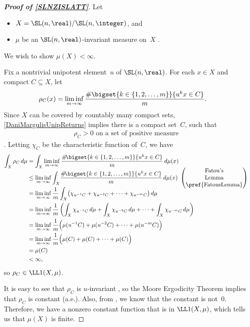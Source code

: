 \begin{proof}[\bf Proof of \cref{SLNZISLATT}]
Let 
	\begin{itemize}
	\item $X = \SL(n,\real)/\SL(n,\integer)$,
	and
	\item $\mu$ be an $\SL(n,\real)$-invariant measure on~$X$ .
	\end{itemize}
We wish to show $\mu(X) < \infty$.

Fix a nontrivial unipotent element~$u$ of $\SL(n,\real)$. For each $x \in X$ and compact $C \subseteq X$, let
	\begin{align*}
	 \rho_C( x ) 
	 &= \liminf_{m \to \infty} \frac{ \# \bigset{ k \in \{1,2,\ldots,m\} }{ u^k x \in C }  } {m} 
	 . \end{align*}
Since $X$ can be covered by countably many compact sets, \cref{DaniMargulisUnipReturns} implies there is a compact set~$C$, such that
	\begin{align} \label{rhoC>0}
	 \text{$\rho_C > 0$ on a set of positive measure} 
	 \end{align}
. 
Letting $\chi_C$ be the characteristic function of~$C$, we have
	\begin{align*}
	\int_X \rho_C  \, d\mu
	&= \int_X \liminf_{m \to \infty} \frac{ \# \! \bigset{ k \in \{1,2,\ldots,m\} }{ u^k x \in C }  } {m} \, d\mu(x)
	\\&\le  \liminf_{m \to \infty} \int_X  \! \frac{ \# \! \bigset{ k \in \{1,2,\ldots,m\} }{ u^k x \in C }  } {m} \, d\mu(x)
	 \vbox to 0pt{\vss\vskip-5pt\hbox{\hskip0.07in$\begin{pmatrix} \text{Fatou's} \\ \text{Lemma} \\ \text{\pref{FatousLemma}} \end{pmatrix}$}\vss} %
	\\&=  \liminf_{m \to \infty} \frac{1}{m} \int_X  \bigl( \chi_{u^{-1}C} + \chi_{u^{-2}C} + \cdots  + \chi_{u^{-m}C} \bigr) \, d\mu
	\\&= \liminf_{m \to \infty}  \frac{1}{m} \left( \int_X \chi_{u^{-1}C}  \, d\mu + \int_X \chi_{u^{-2}C}  \, d\mu + \cdots  
		+ \int_X \chi_{u^{-m}C}   \, d\mu \right)
	\\&= \liminf_{m \to \infty} \frac{1}{m} \Bigl( \mu( u^{-1} C ) +  \mu( u^{-2} C ) + \cdots  
		+  \mu( u^{-m} C ) \Bigr)
	\\&= \liminf_{m \to \infty} \frac{1}{m} \Bigl( \mu(C) +  \mu(C)  + \cdots  +  \mu(C) \Bigr)
	\\&= \mu(C)
	\\&< \infty
	, \end{align*}
so $\rho_C \in \LL1(X, \mu)$.

It is easy to see that $\rho_C$ is $u$-invariant , so the Moore Ergodicity Theorem  implies that $\rho_C$ is constant (a.e.).
Also, from , we know that the constant is not~$0$. Therefore, we have a nonzero constant function that is in $\LL1(X,\mu)$, which tells us that $\mu(X)$ is finite.
\end{proof}

